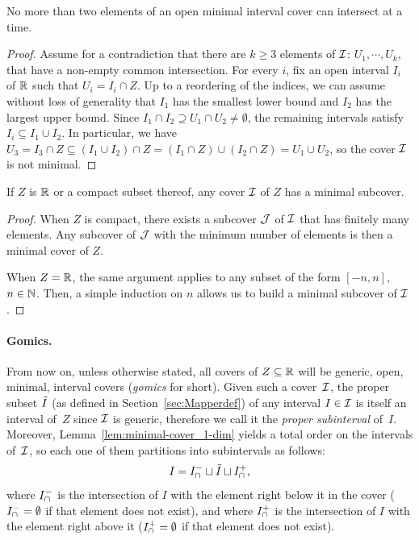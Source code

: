 \begin{lem}\label{lem:minimal-cover_1-dim}
No more than two elements of an open minimal interval cover can intersect at a time.
\end{lem}
%
\begin{proof}
Assume for a contradiction that there are $k\geq 3$ elements
of $\mathcal{I}$: $U_1, \cdots, U_k$, that have a non-empty common intersection. For
every $i$, fix an open interval $I_i$ of $\mathbb{R}$ such that $U_i=I_i\cap Z$. Up to
a reordering of the indices, we can assume without loss of generality
that $I_1$ has the smallest lower bound and $I_2$ has the largest
upper bound. Since $I_1\cap I_2 \supseteq U_1\cap U_2 \neq\emptyset$,
the remaining intervals satisfy $I_i\subseteq I_1\cup I_2$. In
particular, we have $U_3= I_3\cap Z\subseteq (I_1\cup I_2)\cap Z =
(I_1\cap Z)\cup (I_2\cap Z) = U_1\cup U_2$, so the cover $\mathcal{I}$ is not
minimal.
\end{proof}
%
\begin{lem}
If $Z$ is $\mathbb{R}$ or a compact subset thereof, any cover $\mathcal{I}$
of $Z$ has a minimal subcover.
\end{lem}
%
\begin{proof}
When $Z$ is compact, there exists a subcover $\mathcal{J}$ of $\mathcal{I}$ that has
finitely many elements.  Any subcover of $\mathcal{J}$ with the minimum number of
elements is then a minimal cover of $Z$.

When $Z=\mathbb{R}$, the same argument applies to any subset of the form $[-n, n]$, $n\in \mathbb{N}$. 
Then, a simple induction on $n$ allows us to build a minimal subcover of $\mathcal{I}$. 
\end{proof}

\paragraph*{Gomics.} From now on, unless otherwise stated, all covers of $Z\subseteq \mathbb{R}$
will be generic, open, minimal, interval covers ({\em gomics} for
short). Given such a cover~$\mathcal{I}$, the proper subset $\tilde I$ (as defined in Section~\ref{sec:Mapperdef}) of any
interval $I\in\mathcal{I}$ is itself an interval of~$Z$ since $\mathcal{I}$ is generic, therefore we call it
the {\em proper subinterval} of~$I$.
Moreover, Lemma~\ref{lem:minimal-cover_1-dim} yields a total order on the intervals of~$\mathcal{I}$, 
so each one of them partitions into subintervals as follows:
%
\begin{equation}\label{eq:U_partition}
I=I_\cap^-\sqcup\tilde I\sqcup I_\cap^+,
\end{equation}
%
where $I_\cap^-$ is the intersection of $I$ with the element right below it in the cover ($I_\cap^-=\emptyset$ if that element does not exist), 
and where $I_\cap^+$ is the intersection of $I$ with the element right above it ($I_\cap^+=\emptyset$ if that element does not exist). 



